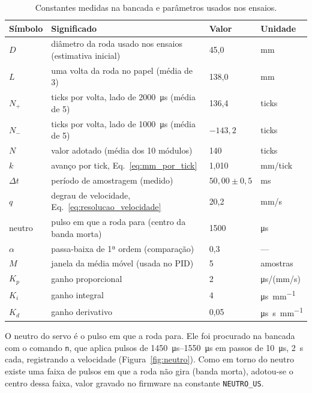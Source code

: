 \documentclass[12pt]{article}
\begin{document}
\begin{table}[H]
  \centering
  \caption{Constantes medidas na bancada e parâmetros usados nos ensaios.}
  \label{tab:constantes}
  \begin{tabular}{llll}
    \toprule
    Símbolo & Significado & Valor & Unidade \\
    \midrule
    $D$ & diâmetro da roda usado nos ensaios (estimativa inicial) & 45,0 & mm \\
    $L$ & uma volta da roda no papel (média de 3) & 138,0 & mm \\
    $N_+$ & ticks por volta, lado de \SI{2000}{\micro\second} (média de 5) & 136,4 & ticks \\
    $N_-$ & ticks por volta, lado de \SI{1000}{\micro\second} (média de 5) & $-143{,}2$ & ticks \\
    $N$ & valor adotado (média dos 10 módulos) & 140 & ticks \\
    $k$ & avanço por tick, Eq.~\eqref{eq:mm_por_tick} & 1,010 & mm/tick \\
    $\Delta t$ & período de amostragem (medido) & $50{,}00 \pm 0{,}5$ & ms \\
    $q$ & degrau de velocidade, Eq.~\eqref{eq:resolucao_velocidade} & 20,2 & mm/s \\
    neutro & pulso em que a roda para (centro da banda morta) & 1500 & \si{\micro\second} \\
    $\alpha$ & passa-baixa de 1ª ordem (comparação) & 0,3 & --- \\
    $M$ & janela da média móvel (usada no PID) & 5 & amostras \\
    $K_p$ & ganho proporcional & 2 & \si{\micro\second}/(mm/s) \\
    $K_i$ & ganho integral & 4 & \si{\micro\second\per\milli\meter} \\
    $K_d$ & ganho derivativo & 0,05 & \si{\micro\second\second\per\milli\meter} \\
    \bottomrule
  \end{tabular}
\end{table}

O neutro do servo é o pulso em que a roda para. Ele foi procurado na bancada com o comando \texttt{n}, que aplica pulsos de \SIrange{1450}{1550}{\micro\second} em passos de \SI{10}{\micro\second}, \SI{2}{\second} cada, registrando a velocidade (Figura~\ref{fig:neutro}). Como em torno do neutro existe uma faixa de pulsos em que a roda não gira (banda morta), adotou-se o centro dessa faixa, valor gravado no firmware na constante \texttt{NEUTRO\_US}.
\end{document}
